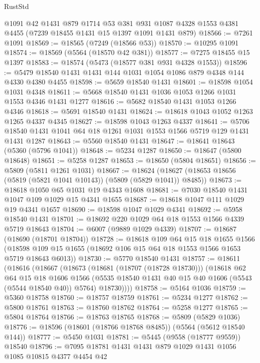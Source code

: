 \begin{lexlean}{RustStd}
\begin{coremodule}
    @1091
    @42
    @1431
    @879
    @1714
    @53
    @381
    @931
    @1087
    @4328
    @1553
    @4381
    @4455
    (@7239 @18455 @1431 @15 @1397 @1091 @1431 @879)
@18566 := @7261 @1091
@18569 := @18565 (@7249 (@18566 @53))
@18570 := @10295 @1091
@18574 := @18569 (@5564 (@18570 @42 @381))
@18577 := @7275 @18455 @15 @1397
@18583 := @18574 (@5473 (@18577 @381 @931 @4328 @1553))
@18596 := @5479 @18540 @1431 @1431 @144 @1031 @1054 @1086 @879 @4348 @144 @4330 @4380 @4455
@18598 := @5659 @18540 @1431
@18601 := @18598 @1054 @1031 @4348
@18611 := @5668 @18540 @1431 @1036 @1053 @1266 @1031 @1553 @4346 @1431 @1277
@18616 := @5682 @18540 @1431 @1053 @1266 @4346
@18618 := @5691 @18540 @1431
@18624 := @18618 @1043 @1052 @1263 @1265 @4337 @4345
@18627 := @18598 @1043 @1263 @4337
@18641 := @5706 @18540 @1431 @1041 @64 @18 @1261 @1031 @1553 @1566 @5719 @129 @1431 @1431 @1287
@18643 := @5560 @18540 @1431
@18647 := @18641 @18643 (@5360 (@5796 @1041))
@18648 := @5234 @1287
@18650 := @18647 (@5800 @18648)
@18651 := @5258 @1287
@18653 := @18650 (@5804 @18651)
@18656 := @5809 (@5811 @1261 @1031)
@18667 := @18624 (@18627 (@18653 @18656 (@5819 (@5821 @1041 @10143)) (@5809 (@5829 @1041)) @8485))
@18673 := @18618 @1050 @65 @1031 @19 @4343 @1608
@18681 := @7030 @18540 @1431 @1047 @109 @1029 @15 @4341 @1655
@18687 := @18618 @1047 @111 @1029 @19 @4341 @1657
@18690 := @18598 @1047 @1029 @4341
@18692 := @5958 @18540 @1431
@18701 := @18692 @220 @1029 @64 @18 @1553 @1566 @4339 @5719 @18643
@18704 := @6007 (@9889 @1029 @4339)
@18707 := @18687 (@18690 (@18701 @18704))
@18728 := @18618
    @109
    @64
    @15
    @18
    @1655
    @1566
    (@18598 @109 @15 @1655 (@18692 @106 @15 @64 @18 @1553 @1566 @1653 @5719 @18643 @6013))
@18730 := @5770 @18540 @1431
@18757 := @18611
    (@18616
      (@18667
        (@18673
          (@18681 (@18707 (@18728 @18730)))
          (@18618
            @62
            @64
            @15
            @18
            @1606
            @1566
            (@5535 @18540 @1431 @40 @15 @40 @1606 (@5543 (@5544 @18540 @40)) @5764)
            @18730))))
@18758 := @5164 @1036
@18759 := @5360 @18758
@18760 := @18757 @18759
@18761 := @5234 @1277
@18762 := @5800 @18761
@18763 := @18760 @18762
@18764 := @5258 @1277
@18765 := @5804 @18764
@18766 := @18763 @18765
@18768 := @5809 (@5829 @1036)
@18776 := @18596 (@18601 (@18766 @18768 @8485)) (@5564 (@5612 @18540 @144))
@18777 := @5450 @1031
@18781 := @5445 (@9558 (@18777 @9559)) @18540
@18796 := @7095
    @18781
    @1431
    @1431
    @879
    @1029
    @1431
    @1056
    @1085
    @10815
    @4377
    @4454
    @42

\end{coremodule}
\end{lexlean}
